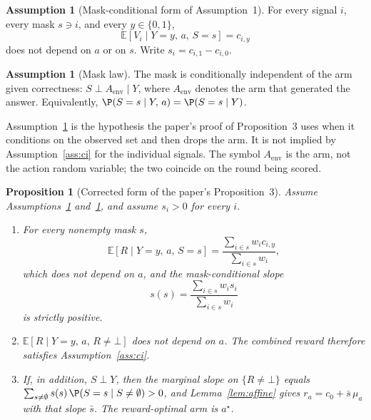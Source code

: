 \documentclass{article}
\newtheorem{proposition}[theorem]{Proposition}
\theoremstyle{definition}
\newtheorem{assumption}[theorem]{Assumption}
\theoremstyle{remark}
\newcommand{\E}{\mathbb{E}}
\begin{document}
\begin{assumption}[Mask-conditional form of Assumption~1]\label{ass:signal}
For every signal $i$, every mask $s\ni i$, and every $y\in\{0,1\}$,
\[
\E[V_i\mid Y=y,\,a,\,S=s]=c_{i,y}
\]
does not depend on $a$ or on $s$. Write $s_i=c_{i,1}-c_{i,0}$.
\end{assumption}

\begin{assumption}[Mask law]\label{ass:mask}
The mask is conditionally independent of the arm given correctness: $S\perp A_{\mathrm{env}}\mid Y$, where $A_{\mathrm{env}}$ denotes the arm that generated the answer. Equivalently, $\P(S=s\mid Y,\,a)=\P(S=s\mid Y)$.
\end{assumption}

Assumption~\ref{ass:mask} is the hypothesis the paper's proof of Proposition~3 uses when it conditions on the observed set and then drops the arm. It is not implied by Assumption~\ref{ass:ci} for the individual signals. The symbol $A_{\mathrm{env}}$ is the arm, not the action random variable; the two coincide on the round being scored.

\begin{proposition}[Corrected form of the paper's Proposition~3]\label{prop:combine}
Assume Assumptions~\ref{ass:signal} and~\ref{ass:mask}, and assume $s_i>0$ for every $i$.
\begin{enumerate}
\item For every nonempty mask $s$,
\[
\E[R\mid Y=y,\,a,\,S=s]
=\frac{\sum_{i\in s}w_i c_{i,y}}{\sum_{i\in s}w_i},
\]
which does not depend on $a$, and the mask-conditional slope
\[
s(s)=\frac{\sum_{i\in s}w_i s_i}{\sum_{i\in s}w_i}
\]
is strictly positive.
\item $\E[R\mid Y=y,\,a,\,R\neq\bot]$ does not depend on $a$. The combined reward therefore satisfies Assumption~\ref{ass:ci}.
\item If, in addition, $S\perp Y$, then the marginal slope on $\{R\neq\bot\}$ equals $\sum_{s\neq\emptyset}s(s)\,\P(S=s\mid S\neq\emptyset)>0$, and Lemma~\ref{lem:affine} gives $r_a=c_0+\bar s\,\mu_a$ with that slope $\bar s$. The reward-optimal arm is $a^\star$.
\end{enumerate}
\end{proposition}
\end{document}
